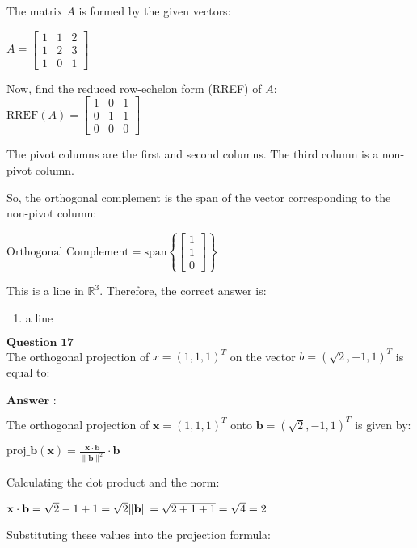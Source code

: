 \documentclass[11pt]{article}
\providecommand{\tightlist}{%
      \setlength{\itemsep}{0pt}\setlength{\parskip}{0pt}}
\begin{document}
The matrix $ A $ is formed by the given vectors:

$ A =
\begin{bmatrix} 1 & 1 & 2 \\ 1 & 2 & 3 \\ 1 & 0 & 1 \end{bmatrix}
$

Now, find the reduced row-echelon form (RREF) of $ A $:
$ \text{RREF}(A) =
\begin{bmatrix} 1 & 0 & 1 \\ 0 & 1 & 1 \\ 0 & 0 & 0 \end{bmatrix}
$

The pivot columns are the first and second columns. The third column is
a non-pivot column.

So, the orthogonal complement is the span of the vector corresponding to
the non-pivot column:

$ \text{Orthogonal Complement} = \text{span}\left\{
\begin{bmatrix} 1 \\ 1 \\ 0 \end{bmatrix}
\right\} $

This is a line in $ \mathbb{R}^3 $. Therefore, the correct answer
is:
\begin{enumerate}
\def\labelenumi{\alph{enumi}.}
\setcounter{enumi}{2}
\tightlist
\item
  a line
\end{enumerate}

    $\textbf{Question 17}$\\
The orthogonal projection of $x=(1,1,1)^T$ on the vector
$b=(\sqrt{2},−1,1)^T$ is equal to:\\
~\\
$\textbf{Answer :}$

    The orthogonal projection of $ \mathbf{x} = (1,1,1)^T $ onto $
\mathbf{b} = (\sqrt{2}, -1, 1)^T $ is given by:

$ \text{proj}\_\mathbf{b}(\mathbf{x}) =
\frac{\mathbf{x} \cdot \mathbf{b}}{\|\mathbf{b}\|^2} \cdot \mathbf{b} $

Calculating the dot product and the norm:

$
\mathbf{x} \cdot \mathbf{b} = \sqrt{2} - 1 + 1 = \sqrt{2} \\
\|\mathbf{b}\| = \sqrt{2 + 1 + 1} = \sqrt{4} = 2
$

Substituting these values into the projection formula:
\end{document}

